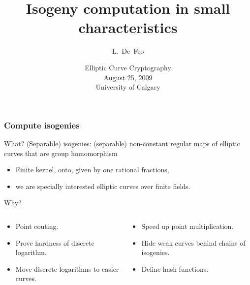 \documentclass[10pt]{beamer}
\title[Computing isogenies in small characteristic]{Isogeny computation in small characteristics}
\author[L.~De~Feo]{L.~De~Feo}
\institute[TANC, LIX]{INRIA Projet TANC, LIX École Polytechnique, France}
\date[ECC, Calgary, August 25, 2009]{Elliptic Curve Cryptography\\August 25, 2009\\University of Calgary}
\newcommand{\0}{\mathcal{O}}  %
\begin{document}
\begin{frame}
  \titlepage
\end{frame}


\begin{frame}
  \frametitle{Compute isogenies}

  \vspace{-2mm}

  \begin{block}{What?}
    \centering
    (Separable) isogenies: (separable) non-constant regular maps of
    elliptic curves that are group homomorphism
    
    \begin{itemize}
    \item Finite kernel, onto, given by one rational fractions,
    \item we are specially interested elliptic curves over finite fields.
    \end{itemize}
  \end{block}

  \vspace{-1mm}

  \begin{block}{Why?}
    \begin{columns}[T]
      \begin{column}{0.53\textwidth}
        \begin{itemize}
        \item Point couting.
        \item Prove hardness of discrete logarithm.
        \item Move discrete logarithms to easier curves.
        \end{itemize}
      \end{column}
      \begin{column}{0.46\textwidth}
        \begin{itemize}
        \item Speed up point multiplication.
        \item Hide weak curves behind chains of isogenies.
        \item Define hash functions.
        \end{itemize}
      \end{column}
    \end{columns}
  \end{block}

  \vspace{-1.5mm}


\end{frame}
\end{document}
